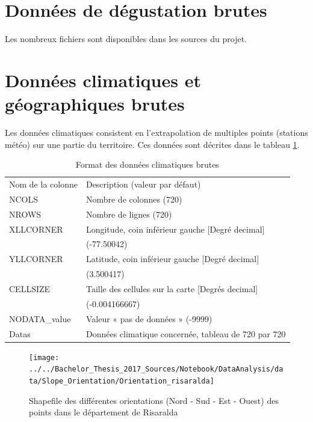 \section{Données de dégustation brutes}
Les nombreux fichiers sont disponibles dans les sources du projet. 

\section{Données climatiques et géographiques brutes}
Les données climatiques consistent en l'extrapolation de multiples points (stations météo) sur une partie du territoire. Ces données sont décrites dans le tableau \ref{ClimaticRawData}.


\begin{table}[H]
	\centering
	\caption{Format des données climatiques brutes}
	\label{ClimaticRawData}
	\begin{tabular}{ll}
		Nom de la colonne & Description (valeur par défaut)                       \\
		NCOLS             & Nombre de colonnes (720)                              \\
		NROWS             & Nombre de lignes (720)                                \\
		XLLCORNER         & Longitude, coin inférieur gauche {[}Degré decimal{]}  \\
		& (-77.50042)                                           \\
		YLLCORNER         & Latitude, coin inférieur gauche {[}Degré decimal{]}   \\
		& (3.500417)                                              \\
		CELLSIZE          & Taille des cellules sur la carte {[}Degrés decimal{]} \\
		& (-0.004166667)                                          \\
		NODATA\_value     & Valeur « pas de données » (-9999)                     \\
		Datas             & Données climatique concernée, tableau de 720 par 720                                                     
	\end{tabular}
\end{table}





\begin{figure}[H]
	\centering
	\caption{Shapefile des différentes orientations (Nord - Sud - Est - Ouest) des points dans le département de Risaralda}
	\label{fig:orientationrisaralda}
	\texttt{[image: ../../Bachelor\_Thesis\_2017\_Sources/Notebook/DataAnalysis/data/Slope\_Orientation/Orientation\_risaralda]}
	
\end{figure}


